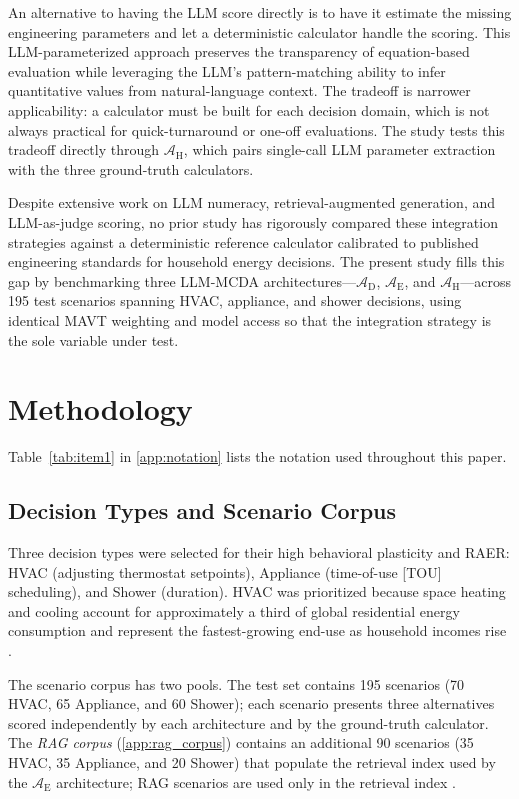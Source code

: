 \documentclass[final,3p,times]{elsarticle}
\begin{document}
An alternative to having the LLM score directly is to have it estimate the missing engineering parameters and let a deterministic calculator handle the scoring. This LLM-parameterized approach preserves the transparency of equation-based evaluation while leveraging the LLM's pattern-matching ability to infer quantitative values from natural-language context. The tradeoff is narrower applicability: a calculator must be built for each decision domain, which is not always practical for quick-turnaround or one-off evaluations. The study tests this tradeoff directly through $\mathcal{A}_{\text{H}}$, which pairs single-call LLM parameter extraction with the three ground-truth calculators.

Despite extensive work on LLM numeracy, retrieval-augmented generation, and LLM-as-judge scoring, no prior study has rigorously compared these integration strategies against a deterministic reference calculator calibrated to published engineering standards for household energy decisions. The present study fills this gap by benchmarking three LLM-MCDA architectures---$\mathcal{A}_{\text{D}}$, $\mathcal{A}_{\text{E}}$, and $\mathcal{A}_{\text{H}}$---across 195 test scenarios spanning HVAC, appliance, and shower decisions, using identical MAVT weighting and model access so that the integration strategy is the sole variable under test.

\section{Methodology}
\label{sec2}

Table~\ref{tab:item1} in \ref{app:notation} lists the notation used throughout this paper.

\subsection{Decision Types and Scenario Corpus}
Three decision types were selected for their high behavioral plasticity and RAER: HVAC (adjusting thermostat setpoints), Appliance (time-of-use [TOU] scheduling), and Shower (duration). HVAC was prioritized because space heating and cooling account for approximately a third of global residential energy consumption and represent the fastest-growing end-use as household incomes rise \cite{GONZALEZTORRES2022112428}.

The scenario corpus has two pools. The test set contains 195 scenarios (70 HVAC, 65 Appliance, and 60 Shower); each scenario presents three alternatives scored independently by each architecture and by the ground-truth calculator. The \textit{RAG corpus} (\ref{app:rag_corpus}) contains an additional 90 scenarios (35 HVAC, 35 Appliance, and 20 Shower) that populate the retrieval index used by the $\mathcal{A}_{\text{E}}$ architecture; RAG scenarios are used only in the retrieval index \cite{lewis2020}.
\end{document}
